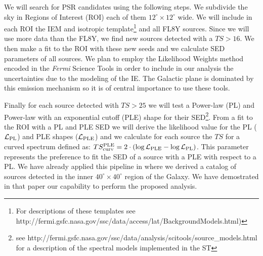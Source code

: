 \documentclass[12pt,twoside,letterpaper,onecolumn,english]{article}
\begin{document}
We will search for PSR candidates using the following steps.
We subdivide the sky in Regions of Interest (ROI) each of them $12^{\circ}\times12^{\circ}$ wide.
We will include in each ROI the IEM and isotropic template\footnote{For descriptions of these templates see http://fermi.gsfc.nasa.gov/ssc/data/access/lat/BackgroundModels.html)} and all FL8Y sources.
Since we will use more data than the FL8Y, we find new sources detected with a $TS>16$.
We then make a fit to the ROI with these new seeds and we calculate SED parameters of all sources.
We plan to employ the Likelihood Weights method encoded in the {\it Fermi} Science Tools in order to include  in our analysis the uncertainties due to the modeling of the IE. 
The Galactic plane is dominated by this emission mechanism so it is of central importance to use these tools.

Finally for each source detected with $TS>25$ we will test a Power-law (PL) and Power-law with an exponential cutoff (PLE) shape for their SED\footnote{see http://fermi.gsfc.nasa.gov/ssc/data/analysis/scitools/source\_models.html for a description of the spectral models implemented in the ST}. 
From a fit to the ROI with a PL and PLE SED we will derive the likelihood value for the PL ($\mathcal{L}_{\rm{PL}}$) and PLE shapes ($\mathcal{L}_{\rm{PLE}}$) and we calculate for each source the $TS$ for a curved spectrum defined as: $TS^{\rm{PLE}}_{\rm{curv}}=2\cdot(\log{\mathcal{L}_{\rm{PLE}}} -
\log{\mathcal{L}_{\rm{PL}}})$. 
This parameter represents the preference to fit the SED of a source with a PLE with respect to a PL.
We have already applied this pipeline in \cite{Fermi-LAT:2017yoi} where we derived a catalog of sources detected in the inner $40^{\circ} \times 40^{\circ}$ region of the Galaxy. We have demostrated in that paper our capability to perform the proposed analysis.
\end{document}
